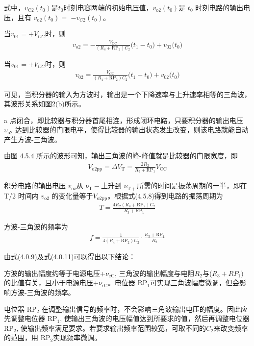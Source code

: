 \documentclass[a4paper,11pt,UTF8]{article}
\numberwithin{equation}{subsection}
\begin{document}
式中，$v_{\mathrm{C2}}(t_0)$是$t_0$时刻电容两端的初始电压值，$v_{\mathrm{o2}}(t_0)$是 $t_0$ 时刻电路的输出电压，且有 $v_{\mathrm{o2}}(t_0)=$ $-v_{C2}(t_0)$。

当$v_{01}=+V_{CC}$时，则
\begin{align}
	v_{o2}=-\frac{V_{\mathrm{CC}}}{(R_{4}+\mathrm{RP}_{2})C_{2}}\big(t_{1}-t_{0}\big)+v_{02}\big(t_{0}\big)
\end{align}

当$v_{01}=+V_{CC}$时，则
\begin{align}
	v_{02}=\frac{V_{\mathrm{CC}}}{(R_{4}+\mathrm{RP}_{2})C_{2}}\big(t_{1}-t_{0}\big)+v_{02}\big(t_{0}\big)
\end{align}

可见，当积分器的输入为方波时，输出是一个下降速率与上升速率相等的三角波，其波形关系如图2(b)所示。

a 点闭合，即比较器与积分器首尾相连，形成闭环电路，只要积分器的输出电压 $\upsilon_\mathrm{o2}$ 达到比较器的门限电平，使得比较器的输出状态发生改变，则该电路就能自动产生方波-三角波。

由图 4.5.4 所示的波形可知，输出三角波的峰-峰值就是比较器的门限宽度，即
\begin{align}
	V_{\mathrm{o2pp}}=\Delta V_{\mathrm{T}}=\frac{2R_{2}}{R_{3}+\mathrm{RP}_{1}}V_{\mathrm{CC}}
\end{align}

积分电路的输出电压 $v_\mathrm{oz}$从 $\nu_\mathrm{T}-$上升到 $\nu_\mathrm{T+}$所需的时间是振荡周期的一半，即在 T/2 时间内 $v_\mathrm{o2}$ 的变化量等于$V_\mathrm{o2pp}$。根据式(4.5.8)得到电路的振荡周期为
\begin{align}
	T=\frac{4R_2(R_4+\mathrm{RP}_2)C_2}{R_3+\mathrm{RP}_1}
\end{align}

方波-三角波的频率为
\begin{align}
	f=\frac{1}{4(R_4+\mathrm{RP}_2)C_2}\cdot\frac{R_3+\mathrm{RP}_1}{R_2}
\end{align}

由式(4.0.9)及式(4.0.11)可以得出以下结论： 

 方波的输出幅度约等于电源电压+$\nu_\mathrm{cC}$, 三角波的输出幅度与电阻$R_2$与($R_3+{RP}_1)$ 的比值有关，且小于电源电压+$\nu_\mathrm{\epsilon C}$。电位器 RP$_{1}$可实现三角波幅度微调，但会影响方波-三角波的频率。

 电位器 RP$_{2}$ 在调整输出信号的频率时，不会影响三角波输出电压的幅度。因此应先调整电位器 RP$_1$, 使输出三角波的电压幅值达到所要求的值，然后再调整电位器 RP$_2$, 使输出频率满足要求。若要求输出频率范围较宽，可取不同的$C_{2}$来改变频率的范围，用 RP$_{2}$实现频率微调。
\end{document}
